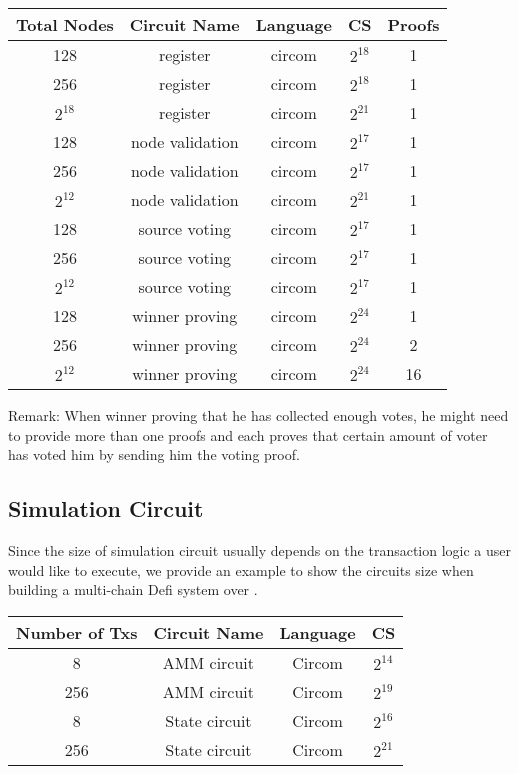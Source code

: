 \begin{table}[!ht]
\small
\centering
\begin{tabular}{ | c | c | c | c | c | }
\hline
Total Nodes & Circuit Name & Language & CS & Proofs \\
\hline
128 & register & circom & $2^{18}$ & 1\\
\hline
256 & register & circom & $2^{18}$ & 1\\
\hline
$2^{18}$ & register & circom & $2^{21}$ & 1\\
\hline
128 & node validation & circom & $2^{17}$ & 1\\
\hline
256 & node validation & circom & $2^{17}$ & 1\\
\hline
$2^{12}$ & node validation & circom & $2^{21}$ & 1 \\
\hline
128 & source voting & circom & $2^{17}$ & 1\\
\hline
256 & source voting & circom & $2^{17}$ & 1\\
\hline
$2^{12}$ & source voting & circom & $2^{17}$ & 1\\
\hline
128 & winner proving & circom & $2^{24}$ & 1\\
\hline
256 & winner proving & circom & $2^{24}$ & 2 \\
\hline
$2^{12}$ & winner proving & circom & $2^{24}$ & 16 \\
\hline
\end{tabular}
\end{table}
Remark: When winner proving that he has collected enough votes, he might need to provide more than one proofs and each proves that certain amount of voter has voted him by sending him the voting proof.

\subsection{Simulation Circuit}
Since the size of simulation circuit usually depends on the transaction logic a user would like to execute, we provide an example to show the circuits size when building a multi-chain Defi system over \dprotocol.

\begin{table}[h]
\small
\centering
\begin{tabular}{ | c | c | c | c | }
\hline
Number of Txs & Circuit Name & Language & CS \\
\hline
8 & AMM circuit & Circom & $2^{14}$ \\
\hline
256 & AMM circuit & Circom & $2^{19}$ \\
\hline
8 & State circuit & Circom & $2^{16}$ \\
\hline
256 & State circuit & Circom & $2^{21}$ \\
\hline
\end{tabular}
\end{table}

